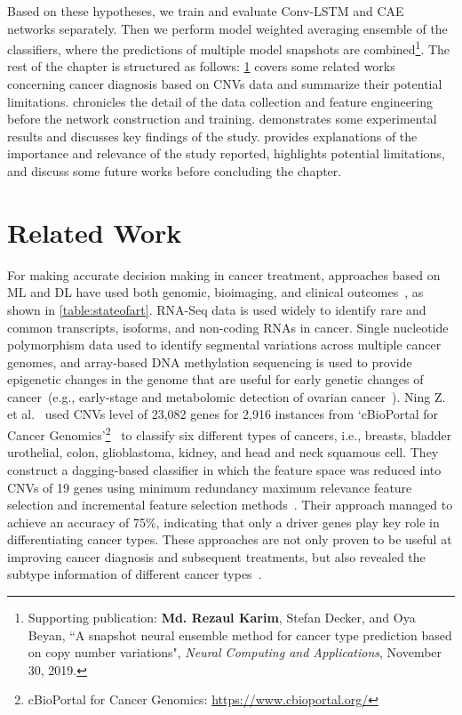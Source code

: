 \hspace*{3.5mm} Based on these hypotheses, we train and evaluate {Conv-LSTM} and CAE networks separately. Then we perform model weighted averaging ensemble of the classifiers, where the predictions of multiple model snapshots are combined\footnote{Supporting publication: \textbf{Md. Rezaul Karim}, Stefan Decker, and Oya Beyan, ``A snapshot neural ensemble method for cancer type prediction based on copy number variations", \emph{Neural Computing and Applications}, November 30, 2019.}.  %
The rest of the chapter is structured as follows:
\cref{chapter_3:rw} covers some related works concerning cancer diagnosis based on CNVs data and summarize their potential limitations.  chronicles the detail of the data collection and feature engineering before the network construction and training.  demonstrates some experimental results and discusses key findings of the study.  provides explanations of the importance and relevance of the study reported, highlights potential limitations, and discuss some future works before concluding the chapter. 

\section{Related Work}\label{chapter_3:rw}
For making accurate decision making in cancer treatment, approaches based on ML and DL have used both genomic, bioimaging, and clinical outcomes~\cite{min}, as shown in \cref{table:stateofart}. RNA-Seq data is used widely to identify rare and common transcripts, isoforms, and non-coding RNAs in cancer. Single nucleotide polymorphism data used to identify segmental variations across multiple cancer genomes, and array-based DNA methylation sequencing is used to provide epigenetic changes in the genome that are useful for early genetic changes of cancer~(e.g., early-stage and metabolomic detection of ovarian cancer~\cite{82Tomczak,95Gaul}). Ning Z. et al.~\cite{zhang2016classification} used CNVs level of 23,082 genes for 2,916 instances from `cBioPortal for Cancer Genomics'\footnote{cBioPortal for Cancer Genomics: \url{https://www.cbioportal.org/}}~\cite{cerami2012cbio} to classify six different types of cancers, i.e., breasts, bladder urothelial, colon, glioblastoma, kidney, and head and neck squamous cell. They construct a dagging-based classifier in which the feature space was reduced into CNVs of 19 genes using minimum redundancy maximum relevance feature selection and incremental feature selection methods~\cite{zhang2016classification}. Their approach managed to achieve an accuracy of 75\%, indicating that only a driver genes play key role in differentiating cancer types. These approaches are not only proven to be useful at improving cancer diagnosis and subsequent treatments, but also revealed the subtype information of different cancer types~\cite{66Huang}.

